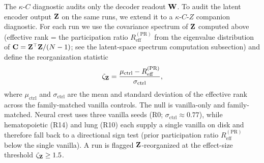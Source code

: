 The $\kappa$-$C$ diagnostic audits only the decoder readout $\mathbf{W}$. To audit the latent encoder output $\mathbf{Z}$ on the same runs, we extend it to a $\kappa$-$C$-$Z$ companion diagnostic. For each run we use the covariance spectrum of $\mathbf{Z}$ computed above (effective rank = the participation ratio $R_{\mathrm{eff}}^{(\mathrm{PR})}$ from the eigenvalue distribution of $\mathbf{C}=\mathbf{Z}^\top\mathbf{Z}/(N-1)$; see the latent-space spectrum computation subsection) and define the reorganization statistic
\begin{equation}
\zeta_{\mathbf{Z}} = \frac{\mu_{\mathrm{ctrl}} - R_{\mathrm{eff}}^{(\mathrm{PR})}}{\sigma_{\mathrm{ctrl}}},
\end{equation}
where $\mu_{\mathrm{ctrl}}$ and $\sigma_{\mathrm{ctrl}}$ are the mean and standard deviation of the effective rank across the family-matched vanilla controls. The null is vanilla-only and family-matched. Neural crest uses three vanilla seeds (R0; $\sigma_{\mathrm{ctrl}}\approx0.77$), while hematopoietic (R14) and lung (R10) each supply a single vanilla on disk and therefore fall back to a directional sign test (prior participation ratio $R_{\mathrm{eff}}^{(\mathrm{PR})}$ below the single vanilla). A run is flagged $\mathbf{Z}$-reorganized at the effect-size threshold $\zeta_{\mathbf{Z}}\geq1.5$.


